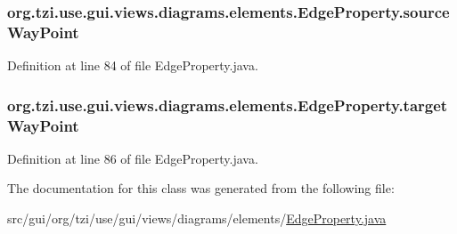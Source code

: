 \hypertarget{classorg_1_1tzi_1_1use_1_1gui_1_1views_1_1diagrams_1_1elements_1_1_edge_property_ad4479c503d203ac72635b7655d038e95}{
\subsubsection[{source\-Way\-Point}]{ org.\-tzi.\-use.\-gui.\-views.\-diagrams.\-elements.\-Edge\-Property.\-source\-Way\-Point\hspace{0.3cm}{\ttfamily [protected]}}}\label{classorg_1_1tzi_1_1use_1_1gui_1_1views_1_1diagrams_1_1elements_1_1_edge_property_ad4479c503d203ac72635b7655d038e95}


Definition at line 84 of file Edge\-Property.\-java.

\hypertarget{classorg_1_1tzi_1_1use_1_1gui_1_1views_1_1diagrams_1_1elements_1_1_edge_property_a2c52e44c9688446cfcded4a3f779278c}{
\subsubsection[{target\-Way\-Point}]{ org.\-tzi.\-use.\-gui.\-views.\-diagrams.\-elements.\-Edge\-Property.\-target\-Way\-Point\hspace{0.3cm}{\ttfamily [protected]}}}\label{classorg_1_1tzi_1_1use_1_1gui_1_1views_1_1diagrams_1_1elements_1_1_edge_property_a2c52e44c9688446cfcded4a3f779278c}


Definition at line 86 of file Edge\-Property.\-java.



The documentation for this class was generated from the following file\-:\begin{DoxyCompactItemize}
\item 
src/gui/org/tzi/use/gui/views/diagrams/elements/\hyperlink{_edge_property_8java}{Edge\-Property.\-java}\end{DoxyCompactItemize}
